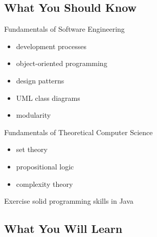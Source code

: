 \subsection{What You Should Know}

\begin{frame}{\myframetitle{}}
	\begin{fancycolumns}
		\begin{note}{Fundamentals of Software Engineering}
			\begin{itemize}
				\item development processes
				\item object-oriented programming
				\item design patterns
				\item UML class diagrams
				\item modularity
			\end{itemize}
		\end{note}
	\nextcolumn
		\begin{note}{Fundamentals of Theoretical Computer Science}
			\begin{itemize}
				\item set theory
				\item propositional logic
				\item complexity theory
			\end{itemize}
		\end{note}
		\begin{note}{Exercise}
			solid programming skills in Java

		\end{note}
	\end{fancycolumns}
\end{frame}

\subsection{What You Will Learn}

\begin{frame}{\myframetitle{}}
	\lectureseriesoverview[1]
\end{frame}

